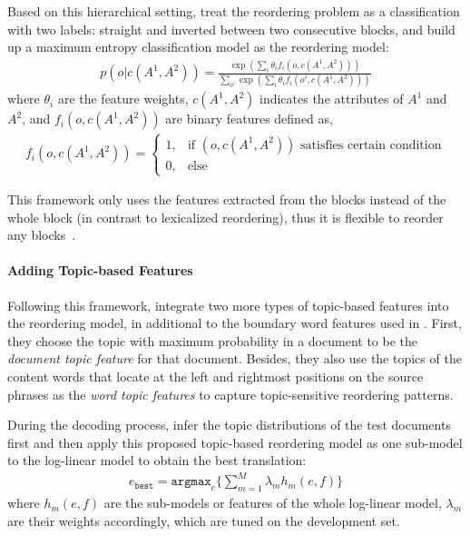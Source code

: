 Based on this hierarchical setting, \citet{Xiong-2006} treat the reordering problem as a classification with two labels: straight and inverted between two consecutive blocks, and build up a maximum entropy classification model as the reordering model:
\begin{align}
p(o|c(A^1, A^2)) = \frac{\exp(\sum_i \theta_i f_i(o, c(A^1, A^2)))}{\sum_{o'} \exp(\sum_i \theta_i f_i(o', c(A^1, A^2)))}
\end{align}
where $\theta_i$ are the feature weights, $c(A^1, A^2)$ indicates the attributes of $A^1$ and $A^2$, and $f_i(o, c(A^1, A^2))$ are binary features defined as,
\begin{align}
f_i(o, c(A^1,A^2)) = \begin{cases}
1, &\text{if $(o,c(A^1, A^2))$ satisfies certain condition} \\
0, &\text{else}
\end{cases}
\end{align}

This framework only uses the features extracted from the blocks
instead of the whole block (in contrast to lexicalized reordering),
thus it is flexible to reorder any blocks~\citep{Xiong-2006}.

\paragraph{Adding Topic-based Features}

Following this framework, \citet{wang-14} integrate two more types of
topic-based features into the reordering model, in additional to the
boundary word features used in \citet{Xiong-2006}. First, they choose
the topic with maximum probability in a document to be the
\textit{document topic feature} for that document. Besides, they also
use the topics of the content words that locate at the left and
rightmost positions on the source phrases as the \textit{word topic
  features} to capture topic-sensitive reordering patterns.

During the decoding process, \citet{Xiong-2006} infer the topic distributions of the test documents first and then apply this proposed topic-based reordering model as one sub-model to the log-linear model to obtain the best translation:
\begin{align}
e_\texttt{best} = \texttt{argmax}_e \Big \{ \sum_{m=1}^M \lambda_m h_m(e,f) \Big \}
\end{align}
where $h_m(e,f)$ are the  sub-models or features of the whole log-linear model, $\lambda_m$ are their weights accordingly, which are tuned on the development set.

